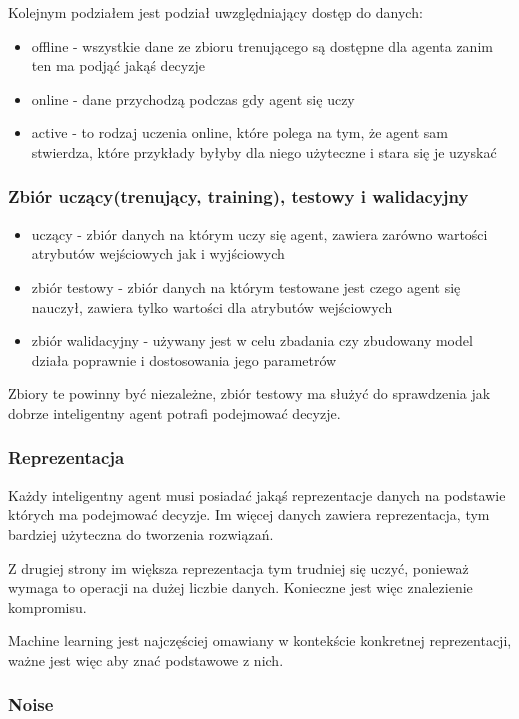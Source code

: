 \documentclass[a4paper,15pt]{article}
\begin{document}
Kolejnym podziałem jest podział uwzględniający dostęp do danych:
\begin{itemize}
\item offline - wszystkie dane ze zbioru trenującego są dostępne dla agenta zanim ten ma podjąć jakąś decyzje 
\item online - dane przychodzą podczas gdy agent się uczy
\item active - to rodzaj uczenia online, które polega na tym, że agent sam stwierdza, które przykłady byłyby dla niego użyteczne i stara się je uzyskać 
\end{itemize}


\subsubsection{Zbiór uczący(trenujący, training), testowy i walidacyjny}

\begin{itemize}
\item uczący - zbiór danych na którym uczy się agent, zawiera zarówno wartości atrybutów wejściowych jak i wyjściowych
\item zbiór testowy - zbiór danych na którym testowane jest czego agent się nauczył, zawiera tylko wartości dla atrybutów wejściowych
\item zbiór walidacyjny - używany jest w celu zbadania czy zbudowany model działa poprawnie i dostosowania jego parametrów
\end{itemize}

Zbiory te powinny być niezależne, zbiór testowy ma służyć do sprawdzenia jak dobrze inteligentny agent potrafi podejmować decyzje. 

\subsubsection{Reprezentacja}

Każdy inteligentny agent musi posiadać jakąś reprezentacje danych na podstawie których ma podejmować decyzje. Im więcej danych zawiera reprezentacja, tym bardziej użyteczna do tworzenia rozwiązań. 

Z drugiej strony im większa reprezentacja tym trudniej się uczyć, ponieważ wymaga to operacji na dużej liczbie danych. Konieczne jest więc znalezienie kompromisu. 

Machine learning jest najczęściej omawiany w kontekście konkretnej reprezentacji, ważne jest więc aby znać podstawowe z nich. 


\subsubsection{Noise}
\end{document}
